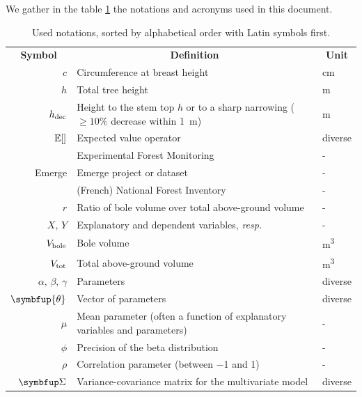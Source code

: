 We gather in the table \ref{tab::notations} the notations and acronyms used in this document.
\begin{table}[h]
	\centering
	\begin{tabular}{@{}rp{10cm}l@{}}
		\toprule
		\multicolumn{1}{c}{\textbf{Symbol}} & \multicolumn{1}{c}{\textbf{Definition}} & \multicolumn{1}{c}{\textbf{Unit}} \\
		\( c \) & Circumference at breast height & \si{\centi\metre} \\
		\( h \) & Total tree height & \si{\metre} \\
		\( h_{\text{dec}} \) & Height to the stem top \( h \) or to a sharp narrowing (\( \geqslant 10\% \) decrease within \qty{1}{\metre}) & \si{\metre} \\
		\( \operatorname{\mathbb{E}}[] \) & Expected value operator & diverse \\
		\EFM & Experimental Forest Monitoring \parencite{Didion2024} & - \\
		Emerge & Emerge project or dataset \parencite{Deleuze2013} & - \\
		\NFI & (French) National Forest Inventory & - \\
		\( r \) & Ratio of bole volume over total above-ground volume & - \\
		\( X, \, Y \) & Explanatory and dependent variables, \textit{resp.} & - \\
		\( V_{\text{bole}} \) & Bole volume & \si{\cubic\metre} \\
		\( V_{\text{tot}} \) & Total above-ground volume & \si{\cubic\metre} \\
		\( \alpha, \, \beta, \, \gamma \) & Parameters & diverse \\
		\( \symbfup{\theta} \) & Vector of parameters & diverse \\
		\( \mu \) & Mean parameter (often a function of explanatory variables and parameters) & - \\
		\( \phi \) & Precision of the beta distribution & - \\
		\( \rho \) & Correlation parameter (between \num{-1} and \num{1}) & - \\
		\( \Sigmabf \) & Variance-covariance matrix for the multivariate model & diverse \\
		\bottomrule
	\end{tabular}
	\caption{Used notations, sorted by alphabetical order with Latin symbols first.\label{tab::notations}}
\end{table}
